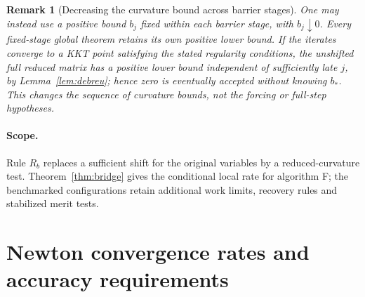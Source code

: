 \documentclass[pdflatex,sn-mathphys-num]{sn-jnl}
\theoremstyle{thmstyleone}
\theoremstyle{thmstylethree}
\newtheorem{remark}[theorem]{Remark}
\newcounter{algorithm}
\begin{document}
\begin{remark}[Decreasing the curvature bound across barrier stages]
One may instead use a positive bound $b_j$ fixed within each barrier
stage, with $b_j\downarrow0$. Every fixed-stage global theorem retains
its own positive lower bound. If the iterates converge to a KKT point
satisfying the stated regularity conditions, the unshifted full reduced
matrix has a positive lower bound
independent of sufficiently late $j$, by Lemma~\ref{lem:debreu}; hence
zero is eventually accepted without knowing $b_*$. This changes the
sequence of curvature bounds, not the forcing or full-step hypotheses.
\end{remark}



\paragraph{Scope.}
Rule $R_b$ replaces a sufficient shift for the original variables by a
reduced-curvature test. Theorem~\ref{thm:bridge} gives the conditional
local rate for algorithm F; the benchmarked configurations retain
additional work limits, recovery rules and stabilized merit tests.


\FloatBarrier
\section{Newton convergence rates and accuracy requirements}\label{supp:newton-proof}
\end{document}

